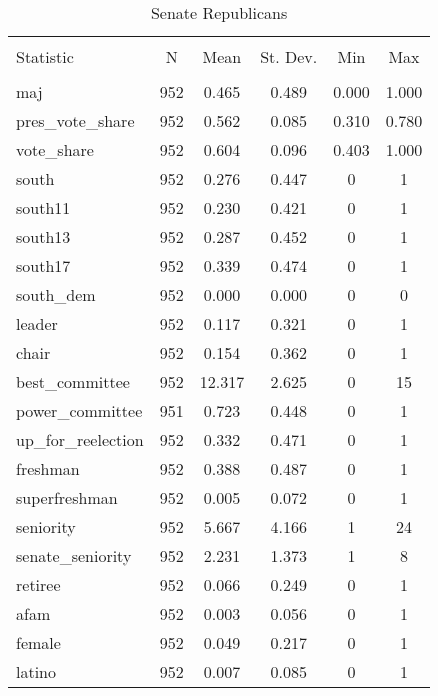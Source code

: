 \documentclass[12pt]{article}
\begin{document}


\begin{table}[ht] \centering 
	\caption{Senate Republicans} 
	\label{} 
	\begin{tabular}{@{\extracolsep{5pt}}lccccc} 
		\\[-1.8ex]\hline 
		\hline \\[-1.8ex] 
		Statistic & \multicolumn{1}{c}{N} & \multicolumn{1}{c}{Mean} & \multicolumn{1}{c}{St. Dev.} & \multicolumn{1}{c}{Min} & \multicolumn{1}{c}{Max} \\ 
		\hline \\[-1.8ex] 
		maj & 952 & 0.465 & 0.489 & 0.000 & 1.000 \\ 
		pres\_vote\_share & 952 & 0.562 & 0.085 & 0.310 & 0.780 \\ 
		vote\_share & 952 & 0.604 & 0.096 & 0.403 & 1.000 \\ 
		south & 952 & 0.276 & 0.447 & 0 & 1 \\ 
		south11 & 952 & 0.230 & 0.421 & 0 & 1 \\ 
		south13 & 952 & 0.287 & 0.452 & 0 & 1 \\ 
		south17 & 952 & 0.339 & 0.474 & 0 & 1 \\ 
		south\_dem & 952 & 0.000 & 0.000 & 0 & 0 \\ 
		leader & 952 & 0.117 & 0.321 & 0 & 1 \\ 
		chair & 952 & 0.154 & 0.362 & 0 & 1 \\ 
		best\_committee & 952 & 12.317 & 2.625 & 0 & 15 \\ 
		power\_committee & 951 & 0.723 & 0.448 & 0 & 1 \\ 
		up\_for\_reelection & 952 & 0.332 & 0.471 & 0 & 1 \\ 
		freshman & 952 & 0.388 & 0.487 & 0 & 1 \\ 
		superfreshman & 952 & 0.005 & 0.072 & 0 & 1 \\ 
		seniority & 952 & 5.667 & 4.166 & 1 & 24 \\ 
		senate\_seniority & 952 & 2.231 & 1.373 & 1 & 8 \\ 
		retiree & 952 & 0.066 & 0.249 & 0 & 1 \\ 
		afam & 952 & 0.003 & 0.056 & 0 & 1 \\ 
		female & 952 & 0.049 & 0.217 & 0 & 1 \\ 
		latino & 952 & 0.007 & 0.085 & 0 & 1 \\ 

\end{tabular}
\end{table}
\end{document}
